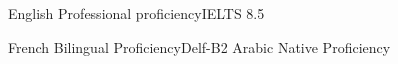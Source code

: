 
\begin{cvskills}

  \cvskill
    {English} %
    {Professional proficiency\hfill IELTS 8.5} %

  \cvskill
    {French} %
    {Bilingual Proficiency\hfill Delf-B2} %
  \cvskill
    {Arabic} %
    {Native Proficiency} %

\end{cvskills}
